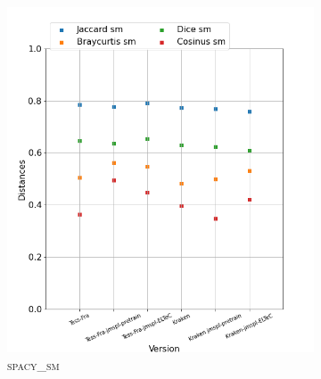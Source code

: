 \begin{figure}[H]
\begin{minipage}{6cm}
\begin{subfigure}{0.89\textwidth}
  \label{fig: }
  \end{subfigure}
  \end{minipage}
  \begin{minipage}{6cm}
  \begin{subfigure}{0.89\textwidth}
  \includegraphics[width=.89\textwidth]{IMAGES/ELTeC_DISTANCES_spaCy3.5.1/ADAM-graph-dist-spaCy3.5.1-sm.png} 
  \caption{\textsc{spacy\_sm}}
  \label{fig:}
  \end{subfigure}
    \end{minipage}
  \begin{minipage}{6cm}
  \begin{subfigure}{0.89\textwidth}

\end{subfigure}
\end{minipage}
\end{figure}

